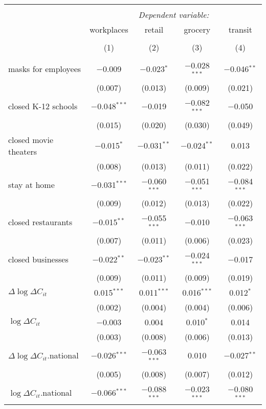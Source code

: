 \begin{tabular}{@{\extracolsep{1pt}}lcccc} 
\\[-1.8ex]\hline 
\hline \\[-1.8ex] 
 & \multicolumn{4}{c}{\textit{Dependent variable:}} \\ 
\cline{2-5} 
 & workplaces & retail & grocery & transit \\ 
\\[-1.8ex] & (1) & (2) & (3) & (4)\\ 
\hline \\[-1.8ex] 
 masks for employees & $-$0.009 & $-$0.023$^{*}$ & $-$0.028$^{***}$ & $-$0.046$^{**}$ \\ 
  & (0.007) & (0.013) & (0.009) & (0.021) \\ 
  closed K-12 schools & $-$0.048$^{***}$ & $-$0.019 & $-$0.082$^{***}$ & $-$0.050 \\ 
  & (0.015) & (0.020) & (0.030) & (0.049) \\ 
  closed movie theaters & $-$0.015$^{*}$ & $-$0.031$^{**}$ & $-$0.024$^{**}$ & 0.013 \\ 
  & (0.008) & (0.013) & (0.011) & (0.022) \\ 
  stay at home & $-$0.031$^{***}$ & $-$0.060$^{***}$ & $-$0.051$^{***}$ & $-$0.084$^{***}$ \\ 
  & (0.009) & (0.012) & (0.013) & (0.022) \\ 
  closed restaurants & $-$0.015$^{**}$ & $-$0.055$^{***}$ & $-$0.010 & $-$0.063$^{***}$ \\ 
  & (0.007) & (0.011) & (0.006) & (0.023) \\ 
  closed businesses & $-$0.022$^{**}$ & $-$0.023$^{**}$ & $-$0.024$^{***}$ & $-$0.017 \\ 
  & (0.009) & (0.011) & (0.009) & (0.019) \\ 
  $\Delta \log \Delta C_{it}$ & 0.015$^{***}$ & 0.011$^{***}$ & 0.016$^{***}$ & 0.012$^{*}$ \\ 
  & (0.002) & (0.004) & (0.004) & (0.006) \\ 
  $\log \Delta C_{it}$ & $-$0.003 & 0.004 & 0.010$^{*}$ & 0.014 \\ 
  & (0.003) & (0.008) & (0.006) & (0.013) \\ 
  $\Delta \log \Delta C_{it}$.national & $-$0.026$^{***}$ & $-$0.063$^{***}$ & 0.010 & $-$0.027$^{**}$ \\ 
  & (0.005) & (0.008) & (0.007) & (0.012) \\ 
  $\log \Delta C_{it}$.national & $-$0.066$^{***}$ & $-$0.088$^{***}$ & $-$0.023$^{***}$ & $-$0.080$^{***}$ \\ 

\end{tabular}
